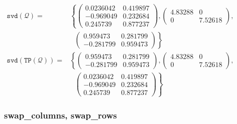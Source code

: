 \begin{description}
  \(\begin{aligned}
     \mathtt{svd(\mathcal{Q})} = &
       \left\{
         \begin{pmatrix} 0.0236042 & 0.419897 \\ -0.969049 & 0.232684 \\ 0.245739 & 0.877237 \end{pmatrix},
         \begin{pmatrix}  4.83288 & 0 \\ 0 & 7.52618 \end{pmatrix}, \right.  \\
         & \left. \: \; \,
           \begin{pmatrix} 0.959473 & 0.281799 \\ - 0.281799 & 0.959473 \end{pmatrix}
       \right\} \\[2mm]
      \mathtt{svd(TP(\mathcal{Q}))} = &
       \left\{
         \begin{pmatrix} 0.959473 & 0.281799 \\ - 0.281799 & 0.959473 \end{pmatrix},
         \begin{pmatrix}  4.83288 & 0 \\ 0 & 7.52618 \end{pmatrix}, \right.  \\
         & \left. \: \; \,
         \begin{pmatrix} 0.0236042 & 0.419897 \\ -0.969049 & 0.232684 \\ 0.245739 & 0.877237 \end{pmatrix}
       \right\}
    \end{aligned}\)
\end{description}


\subsubsection{swap\_columns, swap\_rows}
\label{linalg:swap_columns}

